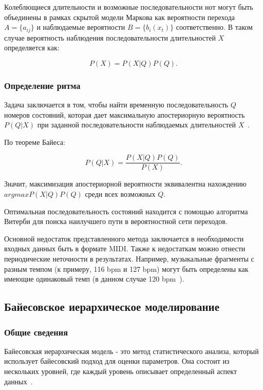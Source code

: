 Колеблющиеся длительности и возможные последовательности нот могут быть объединены в рамках скрытой модели Маркова как вероятности перехода $A = \{a_{ij}\}$ и наблюдаемые вероятности $B = \{b_i(x_t)\}$ соответственно. В таком случае вероятность наблюдения последовательности длительностей $X$ определяется как:

\begin{equation}
	P(X) = P(X|Q)P(Q).
\end{equation}

\subsubsection{Определение ритма}

Задача заключается в том, чтобы найти временную последовательность $Q$ номеров состояний, которая дает максимальную апостериорную вероятность $P(Q|X)$ при заданной последовательности наблюдаемых длительностей $X$~\cite{hmm}.

По теореме Байеса:

\begin{equation}\label{eq:bayes}
	P(Q|X) = \frac{P(X|Q)P(Q)}{P(X)}.
\end{equation}

Значит, максимизация апостериорной вероятности эквивалентна нахождению $argmax P(X|Q)P(Q)$ среди всех возможных $Q$.

Оптимальная последовательность состояний находится с помощью алгоритма Витерби для поиска наилучшего пути в вероятностной сети переходов.

Основной недостаток представленного метода заключается в необходимости входных данных быть в формате MIDI. Также к недостаткам можно отнести периодические неточности в результатах. Например, музыкальные фрагменты с разным темпом (к примеру, 116 bpm и 127 bpm) могут быть определены как имеющие одинаковый темп (в данном случае 120 bpm~\cite{hmm}).

\subsection{Байесовское иерархическое моделирование}

\subsubsection{Общие сведения}

Байесовская иерархическая модель - это метод статистического анализа, который использует байесовский подход для оценки параметров. Она состоит из нескольких уровней, где каждый уровень описывает определенный аспект данных~\cite{kubler_pymc3}.

